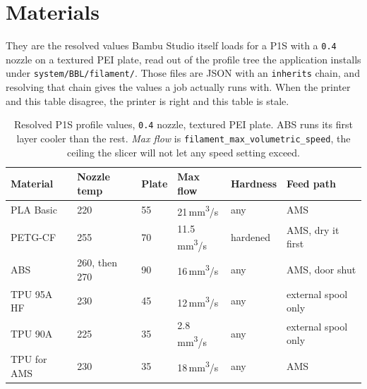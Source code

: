 
\chapter{Materials}

 They are the resolved
values Bambu Studio itself loads for a P1S with a \texttt{0.4} nozzle on a
textured PEI plate, read out of the profile tree the application installs under
\texttt{system/BBL/filament/}. Those files are JSON with an \texttt{inherits}
chain, and resolving that chain gives the values a job actually runs with. When
the printer and this table disagree, the printer is right and this table is
stale.

\begin{table}[ht]
\centering
\begin{tabular}{p{}p{}p{}p{}p{}p{}}
    \toprule
    \textbf{Material} & \textbf{Nozzle temp} & \textbf{Plate} & \textbf{Max flow} & \textbf{Hardness} & \textbf{Feed path} \\
    \midrule
    PLA Basic     & 220\,\textcelsius{}              & 55\,\textcelsius{} & 21\,mm\textsuperscript{3}/s   & any        & AMS \\[3pt]
    PETG-CF       & 255\,\textcelsius{}              & 70\,\textcelsius{} & 11.5\,mm\textsuperscript{3}/s & hardened   & AMS, dry it first \\[3pt]
    ABS           & 260, then 270\,\textcelsius{}    & 90\,\textcelsius{} & 16\,mm\textsuperscript{3}/s   & any        & AMS, door shut \\[3pt]
    TPU 95A HF    & 230\,\textcelsius{}              & 45\,\textcelsius{} & 12\,mm\textsuperscript{3}/s   & any        & external spool only \\[3pt]
    TPU 90A       & 225\,\textcelsius{}              & 35\,\textcelsius{} & 2.8\,mm\textsuperscript{3}/s  & any        & external spool only \\[3pt]
    TPU for AMS   & 230\,\textcelsius{}              & 35\,\textcelsius{} & 18\,mm\textsuperscript{3}/s   & any        & AMS \\
    \bottomrule
\end{tabular}
\vspace{2em}
\caption{Resolved P1S profile values, \texttt{0.4} nozzle, textured PEI plate.
ABS runs its first layer cooler than the rest. \textit{Max flow} is
\texttt{filament\_max\_volumetric\_speed}, the ceiling the slicer will not let
any speed setting exceed.}
\label{tab:materials}
\end{table}

